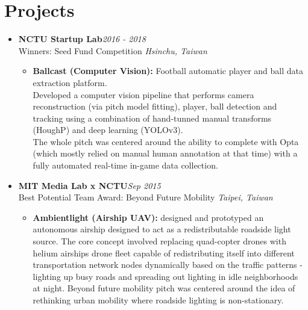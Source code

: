 \section{\sectionheading Projects}

\begin{itemize}[leftmargin=0pt, label={}]%

\item{
{\sectionheading\large{\textbf{NCTU Startup Lab}}}\hfill {\sectionheading\small{\textit{2016 - 2018}}}\\
{\sectionheading\small{Winners: Seed Fund Competition}}\hfill
{\sectionheading\small{\textit{Hsinchu, Taiwan}}}

    \vspace{-6pt}
    \begin{itemize}[label=\textbullet, leftmargin=*, noitemsep]
        \item{\textbf{Ballcast (Computer Vision):} Football automatic player and ball data extraction platform.\\
        Developed a computer vision pipeline that performs camera reconstruction (via pitch model fitting), player, ball detection and tracking using a combination of hand-tunned manual transforms (HoughP) and deep learning (YOLOv3).}\\
        The whole pitch was centered around the ability to complete with Opta (which mostly relied on manual human annotation at that time) with a fully automated real-time in-game data collection.
    \end{itemize}
}

\item{
{\sectionheading\large{\textbf{MIT Media Lab x NCTU}}}\hfill {\sectionheading\small{\textit{Sep 2015}}}\\
{\sectionheading\small{Best Potential Team Award: Beyond Future Mobility}}\hfill
{\sectionheading\small{\textit{Taipei, Taiwan}}}

    \vspace{-6pt}
    \begin{itemize}[label=\textbullet, leftmargin=*, noitemsep]%
        \item{\textbf{Ambientlight (Airship UAV):} designed and prototyped an autonomous airship 
        designed to act as a redistributable roadside light source. The core concept involved replacing quad-copter drones with helium airships drone fleet capable of redistributing itself into different transportation network nodes dynamically based on the traffic patterns - lighting up busy roads and spreading out lighting in idle neighborhoods at night. Beyond future mobility pitch was centered around the idea of rethinking urban mobility where roadside lighting is non-stationary.}
    \end{itemize}
}

\end{itemize}
